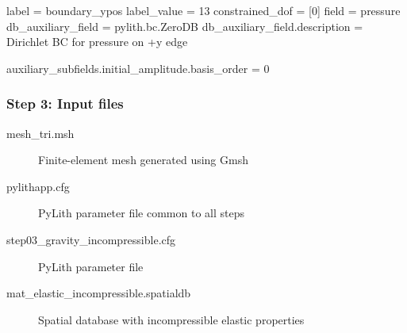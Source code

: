 \documentclass[aspectratio=169]{beamer}
\begin{document}
\begin{frame}[t,fragile]
\begin{minipage}[t]{0.67\textwidth}
\begin{onlyenv}
\begin{cfgcode}
        label = boundary_ypos
        label_value = 13
        constrained_dof = [0]
        field = pressure
        db_auxiliary_field = pylith.bc.ZeroDB
        db_auxiliary_field.description = Dirichlet BC for pressure on +y edge

        auxiliary_subfields.initial_amplitude.basis_order = 0
      \end{cfgcode}
    \end{onlyenv}
  \end{minipage}

  
\end{frame}


\begin{frame}
  \frametitle{Step 3: Input files}
  \summary{}

  \begin{description}
  \item[mesh\_tri.msh] Finite-element mesh generated using Gmsh
  \item[pylithapp.cfg] PyLith parameter file common to all steps
  \item[step03\_gravity\_incompressible.cfg] PyLith parameter file
  \item[mat\_elastic\_incompressible.spatialdb] Spatial database with incompressible elastic properties
  \end{description}

\end{frame}
\end{document}
